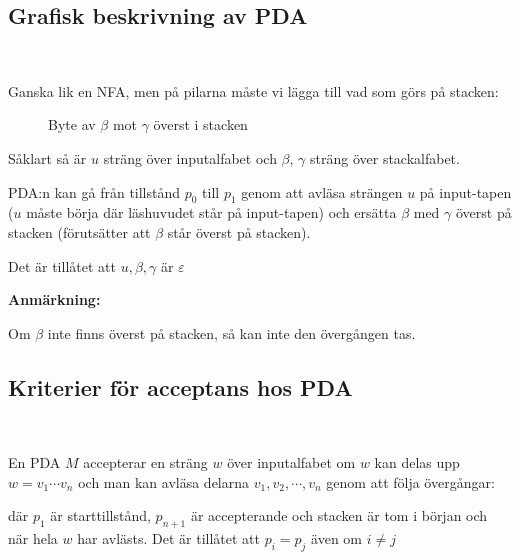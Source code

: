 \subsection{Grafisk beskrivning av PDA}\hfill\\\par
\noindent Ganska lik en NFA, men på pilarna måste vi lägga till vad som görs på stacken:
\begin{figure}[ht!]
    \centering
    \caption{Byte av $\beta$ mot $\gamma$ överst i stacken}
\end{figure}\par
\noindent Såklart så är $u$ sträng över inputalfabet och $\beta$, $\gamma$ sträng över stackalfabet.
\par\bigskip
\noindent PDA:n kan gå från tillstånd $p_0$ till $p_1$ genom att avläsa strängen $u$ på input-tapen ($u$ måste börja där läshuvudet står på input-tapen) och ersätta $\beta$ med $\gamma$ överst på stacken (förutsätter att $\beta$ står överst på stacken).\par
\noindent Det är tillåtet att $u, \beta, \gamma$ är $\varepsilon$
\par\bigskip
\noindent\textbf{Anmärkning:}\par
\noindent Om $\beta$ inte finns överst på stacken, så kan inte den övergången tas.
\newpage
\subsection{Kriterier för acceptans hos PDA}\hfill\\\par
\noindent En PDA $M$ accepterar en sträng $w$ över inputalfabet om $w$ kan delas upp $w = v_1\cdots v_n$ och man kan avläsa delarna $v_1,v_2,\cdots,v_n$ genom att följa övergångar:
\begin{figure}[ht!]
    \centering
    \caption{}
\end{figure}\par
\noindent där $p_1$ är starttillstånd, $p_{n+1}$ är accepterande och stacken är tom i början och när hela $w$ har avlästs. Det är tillåtet att $p_i = p_j$ även om $i\neq j$
\par\bigskip
